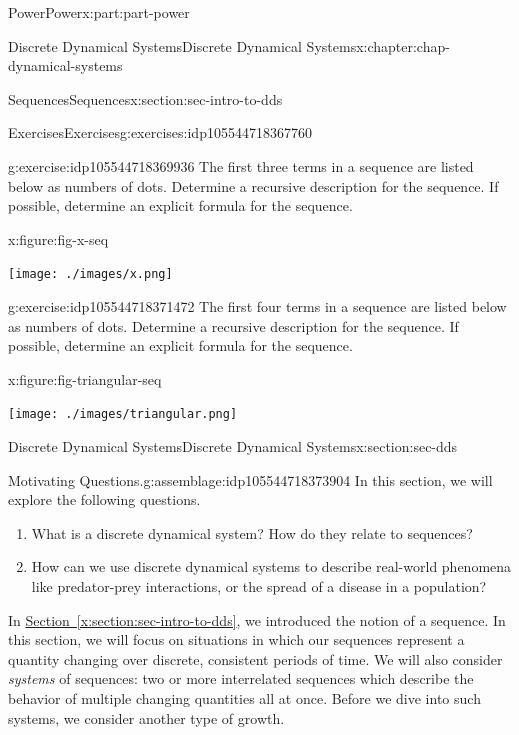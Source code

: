\documentclass[oneside,10pt,]{book}
\newcommand{\xreffont}{\relax}
\numberwithin{equation}{section}
\begin{document}
\begin{partptx}{Power}{}{Power}{}{}{x:part:part-power}
\begin{chapterptx}{Discrete Dynamical Systems}{}{Discrete Dynamical Systems}{}{}{x:chapter:chap-dynamical-systems}
\begin{sectionptx}{Sequences}{}{Sequences}{}{}{x:section:sec-intro-to-dds}
\begin{exercises-subsection-numberless}{Exercises}{}{Exercises}{}{}{g:exercises:idp105544718367760}
\begin{divisionexercise}{2}{}{}{g:exercise:idp105544718369936}
The first three terms in a sequence are listed below as numbers of dots. Determine a recursive description for the sequence. If possible, determine an explicit formula for the sequence.%
\begin{figureptx}{}{x:figure:fig-x-seq}{}%
\begin{image}{0}{1}{0}%
\texttt{[image: ./images/x.png]}
\end{image}%
\tcblower
\end{figureptx}%
\end{divisionexercise}%
\begin{divisionexercise}{3}{}{}{g:exercise:idp105544718371472}%
The first four terms in a sequence are listed below as numbers of dots. Determine a recursive description for the sequence. If possible, determine an explicit formula for the sequence.%
\begin{figureptx}{}{x:figure:fig-triangular-seq}{}%
\begin{image}{0}{1}{0}%
\texttt{[image: ./images/triangular.png]}
\end{image}%
\tcblower
\end{figureptx}%
\end{divisionexercise}%
\end{exercises-subsection-numberless}
\end{sectionptx}
%
%
\typeout{************************************************}
\typeout{************************************************}
%
\begin{sectionptx}{Discrete Dynamical Systems}{}{Discrete Dynamical Systems}{}{}{x:section:sec-dds}
\begin{assemblage}{Motivating Questions.}{g:assemblage:idp105544718373904}%
In this section, we will explore the following questions. %
\begin{enumerate}
\item{}What is a discrete dynamical system? How do they relate to sequences?%
\item{}How can we use discrete dynamical systems to describe real-world phenomena like predator-prey interactions, or the spread of a disease in a population?%
\end{enumerate}
%
\end{assemblage}
\begin{introduction}{}%
In \hyperref[x:section:sec-intro-to-dds]{Section~{\xreffont\ref{x:section:sec-intro-to-dds}}}, we introduced the notion of a sequence. In this section, we will focus on situations in which our sequences represent a quantity changing over discrete, consistent periods of time. We will also consider \emph{systems} of sequences: two or more interrelated sequences which describe the behavior of multiple changing quantities all at once. Before we dive into such systems, we consider another type of growth.%

\end{introduction}
\end{sectionptx}
\end{chapterptx}
\end{partptx}
\end{document}
